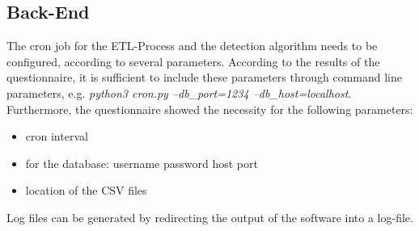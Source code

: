\subsection{Back-End}
The cron job for the ETL-Process and the detection algorithm needs to be configured, according to several parameters. 
According to the results of the questionnaire, it is sufficient to include these parameters through command line parameters, e.g. \textit{python3 cron.py --db\_port=1234 --db\_host=localhost}.
Furthermore, the questionnaire showed the necessity for the following parameters:

\begin{itemize}
	\item cron interval
	\item for the database:
	\subitem username
	\subitem password
	\subitem host
	\subitem port
	\item location of the CSV files
\end{itemize}

Log files can be generated by redirecting the output of the software 
into a log-file. 